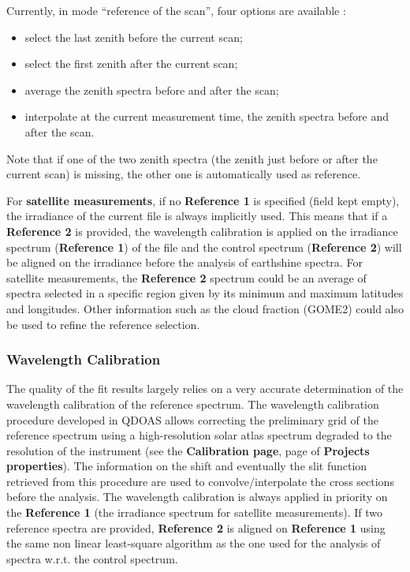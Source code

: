 Currently, in mode ``reference of the scan'', four options are available :

\begin{itemize} \itemsep -3pt
\item select the last zenith before the current scan;
\item select the first zenith after the current scan;
\item average the zenith spectra before and after the scan;
\item interpolate at the current measurement time, the zenith spectra before and after the scan.
\end{itemize}

Note that if one of the two zenith spectra (the zenith just before or after the current scan) is missing, the other one is automatically used as reference.

For \textbf{satellite measurements}, if no \textbf{Reference 1} is specified (field kept empty), the irradiance of the current file is always implicitly used. This means that if a \textbf{Reference 2} is provided, the wavelength calibration is applied on the irradiance spectrum (\textbf{Reference 1}) of the file and the control spectrum (\textbf{Reference 2}) will be aligned on the irradiance before the analysis of earthshine spectra.  For satellite measurements, the \textbf{Reference 2} spectrum could be an average of spectra selected in a specific region given by its minimum and maximum latitudes and longitudes. Other information such as the cloud fraction (GOME2) could also be used to refine the reference selection.

\subsubsection{Wavelength Calibration}
The quality of the fit results largely relies on a very accurate determination of the wavelength calibration of the reference spectrum.  The wavelength calibration procedure developed in QDOAS allows correcting the preliminary grid of the reference spectrum using a high-resolution solar atlas spectrum degraded to the resolution of the instrument (see the \textbf{Calibration page}, page \pageref{sec:projects_calibration_page} of \textbf{Projects properties}).  The information on the shift and eventually the slit function retrieved from this procedure are used to convolve/interpolate the cross sections before the analysis.  The wavelength calibration is always applied in priority on the \textbf{Reference 1} (the irradiance spectrum for satellite measurements). If two reference spectra are provided, \textbf{Reference 2} is aligned on \textbf{Reference 1} using the same non linear least-square algorithm as the one used for the analysis of spectra w.r.t. the control spectrum.


